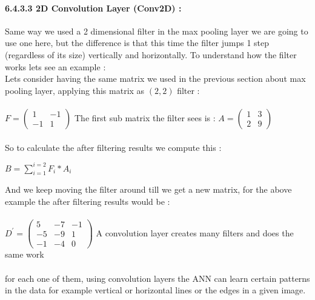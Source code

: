 \documentclass[10pt,a4paper]{article}
\begin{document}
\paragraph{6.4.3.3 2D Convolution Layer (Conv2D) :}
Same way we used a 2 dimensional filter in the max pooling layer we are going to use one here, but the difference is that this time the filter jumps 1 step (regardless of its size) vertically and horizontally. To understand how the filter works lets see an example :\\
Lets consider having the same matrix we used in the previous section about max pooling layer, applying this matrix as $ (2,2) $ filter :\\\\
$F = 
\begin{pmatrix}
1 & -1\\
-1 & 1
\end{pmatrix}
$
The first sub matrix the filter sees is : 
$A = 
\begin{pmatrix}
1 & 3\\
2 & 9
\end{pmatrix}
$\\\\
So to calculate the after filtering results we compute this :\\
\begin{center}
$ B = \sum_{i=1}^{i=2}F_i*A_i $
\end{center}
\newpage
And we keep moving the filter around till we get a new matrix, for the above example the after filtering results would be :\\\\
$D^{\prime} = 
\begin{pmatrix}
5 & -7 & -1\\
-5 & -9 & 1\\
-1 & -4 & 0
\end{pmatrix}
$
A convolution layer creates many filters and does the same work\\\\for each one of them, using convolution layers the ANN can learn certain patterns in the data for example vertical or horizontal lines or the edges in a given image.
\end{document}
